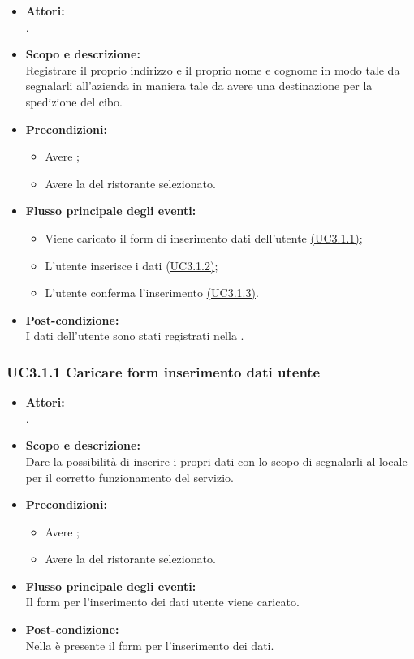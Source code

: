 \begin{itemize}
	\item \textbf{Attori:}
	\\.
	\item \textbf{Scopo e descrizione:} 
	\\Registrare il proprio indirizzo e il proprio nome e cognome in modo tale da segnalarli all'azienda in maniera tale da avere una destinazione per la spedizione del cibo.
	\item \textbf{Precondizioni:}
	\begin{itemize}
		\item Avere ;
		\item Avere la  del ristorante selezionato.
	\end{itemize}
	\item \textbf{Flusso principale degli eventi:}
	\begin{itemize}
		\item Viene caricato il form di inserimento dati dell'utente \hyperref[UC3.1.1]{(UC3.1.1)};
		\item L'utente inserisce i dati \hyperref[UC3.1.2]{(UC3.1.2)};
		\item L'utente conferma l'inserimento \hyperref[UC3.1.3]{(UC3.1.3)}.
	\end{itemize}
	\item \textbf{Post-condizione:}
	\\I dati dell'utente sono stati registrati nella .
\end{itemize}

\subsubsection{UC3.1.1 Caricare form inserimento dati utente} \label{UC3.1.1}

\begin{itemize}
	\item \textbf{Attori:}
	\\.
	\item \textbf{Scopo e descrizione:} 
	\\Dare la possibilità di inserire i propri dati con lo scopo di segnalarli al locale per il corretto funzionamento del servizio.
	\item \textbf{Precondizioni:}
	\begin{itemize}
		\item Avere ;
		\item Avere la  del ristorante selezionato.
	\end{itemize}
	\item \textbf{Flusso principale degli eventi:}
	\\Il form per l'inserimento dei dati utente viene caricato.
	\item \textbf{Post-condizione:}
	\\Nella {} è presente il form per l'inserimento dei dati.
\end{itemize}

